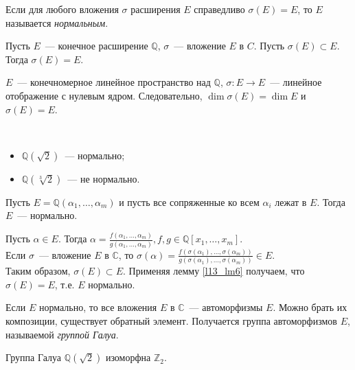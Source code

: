 \begin{definition}
	Если для любого вложения $\sigma$ расширения $E$ справедливо $\sigma(E) = E$, то $E$ называется \textit{нормальным}.
\end{definition}

\begin{lemma} \label{l13_lm6}
	Пусть $E$ — конечное расширение $\mathbb{Q}$, $\sigma$ — вложение $E$ в $C$. Пусть $\sigma(E) \subset E$. Тогда $\sigma(E) = E$.
\end{lemma}

\begin{pf}
	$E$ — конечномерное линейное пространство над $\mathbb{Q}$, $\sigma: E \rightarrow E$ — линейное отображение с нулевым ядром. Следовательно, $\dim \sigma(E) = \dim E$ и $\sigma(E) = E$.
\end{pf}

\begin{example}~\
	\begin{itemize}[nolistsep]
		\item $\mathbb{Q}(\sqrt{2})$ — нормально;
		\item $\mathbb{Q}(\sqrt[3]{2})$ — не нормально.
	\end{itemize}
\end{example}

\begin{theorem} \label{l13_th8}
	Пусть $E = \mathbb{Q}(\alpha_1, \ldots, \alpha_m)$ и пусть все сопряженные ко всем $\alpha_i$ лежат в $E$. Тогда $E$ — нормально.
\end{theorem}
\begin{pf}
	Пусть $\alpha \in E$. Тогда $\alpha = \frac{f(\alpha_1, \ldots, \alpha_m)}{g(\alpha_1, \ldots, \alpha_m)}, f, g \in \mathbb{Q}[x_1, \ldots, x_m]$.\\
	Если $\sigma$ — вложение $E$ в $\mathbb{C}$, то $\sigma(\alpha) = \frac{f(\sigma(\alpha_1), \ldots, \sigma(\alpha_m))}{g(\sigma(\alpha_1), \ldots, \sigma(\alpha_m))} \in E$.\\
	Таким образом, $\sigma(E) \subset E$. Применяя лемму \ref{l13_lm6} получаем, что $\sigma(E) = E$, т.е. $E$ нормально.
\end{pf}

Если $E$ нормально, то все вложения $E$ в $\mathbb{C}$ — автоморфизмы $E$. Можно брать их композиции, существует обратный элемент. Получается группа автоморфизмов $E$, называемой \textit{группой Галуа}.
\begin{example}
	Группа Галуа $\mathbb{Q}(\sqrt{2})$ изоморфна $\mathbb{Z}_2$.
\end{example}

